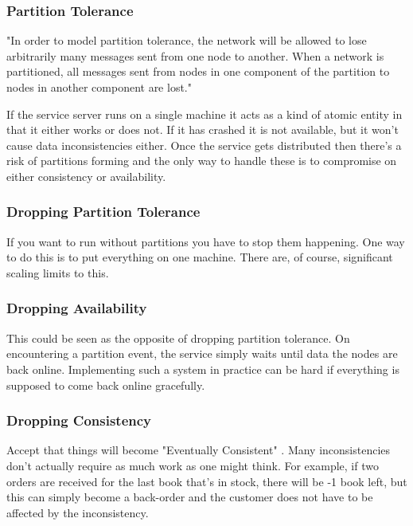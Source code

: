 \subsubsection{Partition Tolerance}

"In order to model partition tolerance, the network will be allowed to lose arbitrarily many messages sent from one node to another. When a network is partitioned, all messages sent from nodes in one component of the partition to nodes in another component are lost." \cite{GilbertLynch}

If the service server runs on a single machine it acts as a kind of atomic entity in that it either works or does not. If it has crashed it is not available, but it won't cause data inconsistencies either. Once the service gets distributed then there's a risk of partitions forming and the only way to handle these is to compromise on either consistency or availability.

\subsubsection{Dropping Partition Tolerance}

If you want to run without partitions you have to stop them happening. One way to do this is to put everything on one machine. There are, of course, significant scaling limits to this.

\subsubsection{Dropping Availability}

This could be seen as the opposite of dropping partition tolerance. On encountering a partition event, the service simply waits until data the nodes are back online. Implementing such a system in practice can be hard if everything is supposed to come back online gracefully.

\subsubsection{Dropping Consistency}

Accept that things will become "Eventually Consistent" \cite{Vogels}. Many inconsistencies don't actually require as much work as one might think. For example, if two orders are received for the last book that's in stock, there will be -1 book left, but this can simply become a back-order and the customer does not have to be affected by the inconsistency.

